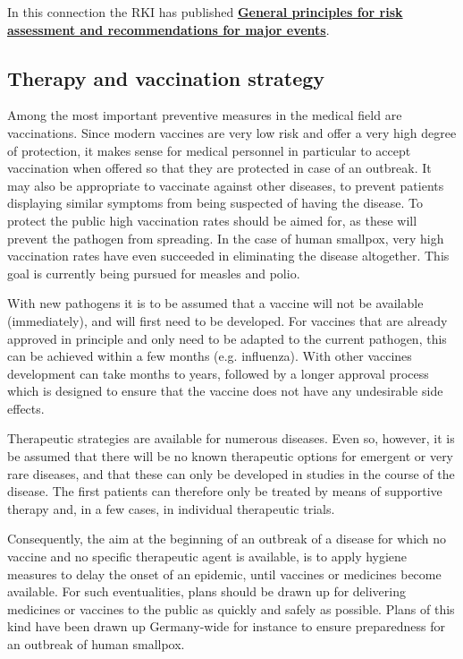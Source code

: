 \documentclass{article}
\begin{document}
In this connection the RKI has published \textbf{\href{https://www.rki.de/DE/Content/InfAZ/N/Neuartiges_Coronavirus/Risiko_Grossveranstaltungen.pdf}{General principles for risk assessment and recommendations for major events}}.


\subsection{Therapy and vaccination strategy}\label{H1461984}



Among the most important preventive measures in the medical field are vaccinations. Since modern vaccines are very low risk and offer a very high degree of protection, it makes sense for medical personnel in particular to accept vaccination when offered so that they are protected in case of an outbreak. It may also be appropriate to vaccinate against other diseases, to prevent patients displaying similar symptoms from being suspected of having the disease. To protect the public high vaccination rates should be aimed for, as these will prevent the pathogen from spreading. In the case of human smallpox, very high vaccination rates have even succeeded in eliminating the disease altogether. This goal is currently being pursued for measles and polio.


With new pathogens it is to be assumed that a vaccine will not be available (immediately), and will first need to be developed. For vaccines that are already approved in principle and only need to be adapted to the current pathogen, this can be achieved within a few months (e.g. influenza). With other vaccines development can take months to years, followed by a longer approval process which is designed to ensure that the vaccine does not have any undesirable side effects.


Therapeutic strategies are available for numerous diseases. Even so, however, it is be assumed that there will be no known therapeutic options for emergent or very rare diseases, and that these can only be developed in studies in the course of the disease. The first patients can therefore only be treated by means of supportive therapy and, in a few cases, in individual therapeutic trials.


Consequently, the aim at the beginning of an outbreak of a disease for which no vaccine and no specific therapeutic agent is available, is to apply hygiene measures to delay the onset of an epidemic, until vaccines or medicines become available. For such eventualities, plans should be drawn up for delivering medicines or vaccines to the public as quickly and safely as possible. Plans of this kind have been drawn up Germany-wide for instance to ensure preparedness for an outbreak of human smallpox.
\end{document}
